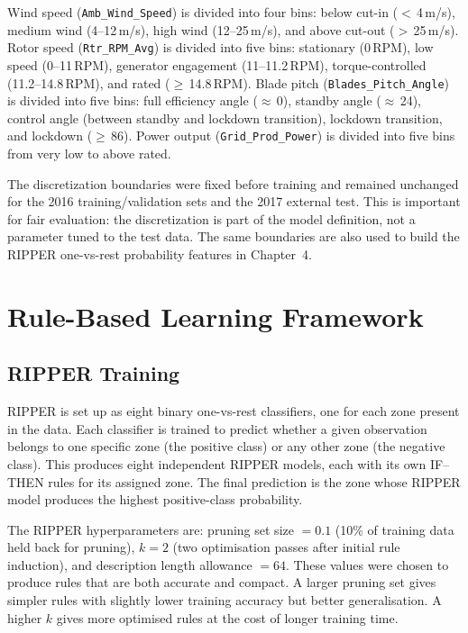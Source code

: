 Wind speed (\texttt{Amb\_Wind\_Speed}) is divided into four bins: below cut-in
($<$\,4\,m/s), medium wind (4--12\,m/s), high wind (12--25\,m/s), and above cut-out
($>$\,25\,m/s). Rotor speed (\texttt{Rtr\_RPM\_Avg}) is divided into five bins:
stationary (0\,RPM), low speed (0--11\,RPM), generator engagement (11--11.2\,RPM),
torque-controlled (11.2--14.8\,RPM), and rated ($\geq$\,14.8\,RPM). Blade pitch
(\texttt{Blades\_Pitch\_Angle}) is divided into five bins: full efficiency angle
($\approx$\,0\textdegree), standby angle ($\approx$\,24\textdegree), control angle
(between standby and lockdown transition), lockdown transition, and lockdown
($\geq$\,86\textdegree). Power output (\texttt{Grid\_Prod\_Power}) is divided into five
bins from very low to above rated.

The discretization boundaries were fixed before training and remained unchanged for the
2016 training/validation sets and the 2017 external test. This is important for fair
evaluation: the discretization is part of the model definition, not a parameter tuned to
the test data. The same boundaries are also used to build the RIPPER one-vs-rest
probability features in Chapter~4.

\section{Rule-Based Learning Framework}
\label{sec:ch3:framework}

\subsection{RIPPER Training}
\label{subsec:ch3:ripper}

RIPPER is set up as eight binary one-vs-rest classifiers, one for each zone present in
the data. Each classifier is trained to predict whether a given observation belongs to
one specific zone (the positive class) or any other zone (the negative class). This
produces eight independent RIPPER models, each with its own IF--THEN rules for its
assigned zone. The final prediction is the zone whose RIPPER model produces the highest
positive-class probability.

The RIPPER hyperparameters are: pruning set size $= 0.1$ (10\% of training data held
back for pruning), $k = 2$ (two optimisation passes after initial rule induction), and
description length allowance $= 64$. These values were chosen to produce rules that are
both accurate and compact. A larger pruning set gives simpler rules with slightly lower
training accuracy but better generalisation. A higher $k$ gives more optimised rules at
the cost of longer training time.

